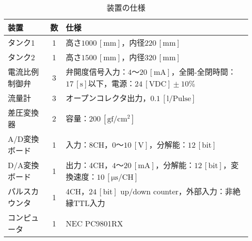 \begin{table}[b] 
  \begin{center}
    \caption{装置の仕様}
    \begin{tabular}{l|c|p{100mm}} \hline
      装置           & 数 & 仕様 \\ \hline
      タンク1        & 1  & 高さ$1000\,\mathrm{[mm]}$，内径$220\,\mathrm{[mm]}$ \\ \hline
      タンク2        & 1  & 高さ$1500\,\mathrm{[mm]}$，内径$320\,\mathrm{[mm]}$ \\ \hline
      電流比例制御弁 & 3  & 弁開度信号入力：$4〜20\,\mathrm{[mA]}$，全開-全閉時間：$17\,\mathrm{[s]}$以下，\newline 電源：$24\,\mathrm{[VDC]} \pm 10 \%$ \\ \hline
      流量計         & 3  & オープンコレクタ出力，$0.1\,\mathrm{[l/Pulse]}$ \\ \hline
      差圧変換器     & 2  & 容量：$200\,\mathrm{[gf/cm^2]}$ \\ \hline
      A/D変換ボード  & 1  & 入力：8CH，$0〜10\,\mathrm{[V]}$，分解能：$12\,\mathrm{[bit]}$ \\ \hline
      D/A変換ボード  & 1  & 出力：4CH，$4〜20\,\mathrm{[mA]}$，分解能：$12\,\mathrm{[bit]}$，変換速度：$10\,\mathrm{[\mu s/CH]}$ \\ \hline
      パルスカウンタ & 1  & 4CH，$24\,\mathrm{[bit]}$ up/down counter，外部入力：非絶縁TTL入力 \\ \hline
      コンピュータ   & 1  & NEC PC9801RX \\ \hline
    \end{tabular}
    \label{tab:spec}
  \end{center}
\end{table}
